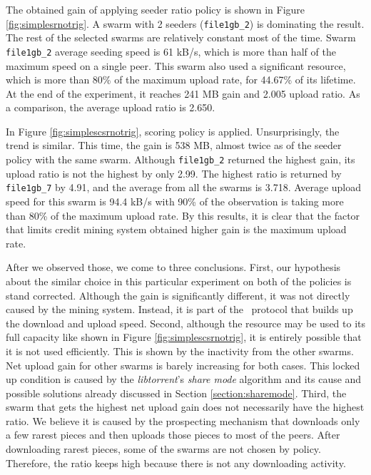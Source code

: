 The obtained gain of applying seeder ratio policy is shown in Figure \ref{fig:simplesrnotrig}. A swarm with 2 seeders (\texttt{file1gb\_2}) is dominating the result. The rest of the selected swarms are relatively constant most of the time. Swarm \texttt{file1gb\_2} average seeding speed is 61 kB/s, which is more than half of the maximum speed on a single peer. This swarm also used a significant resource, which is more than 80\% of the maximum upload rate, for 44.67\% of its lifetime. At the end of the experiment, it reaches 241 MB gain and 2.005 upload ratio. As a comparison, the average upload ratio is 2.650.

In Figure \ref{fig:simplescsrnotrig}, scoring policy is applied. Unsurprisingly, the trend is similar. This time, the gain is 538 MB, almost twice as of the seeder policy with the same swarm.  Although \texttt{file1gb\_2} returned the highest gain, its upload ratio is not the highest by only 2.99.  The highest ratio is returned by \texttt{file1gb\_7} by 4.91, and the average from all the swarms is 3.718. Average upload speed for this swarm is 94.4 kB/s with 90\% of the observation is taking more than 80\% of the maximum upload rate. By this results, it is clear that the factor that limits credit mining system obtained higher gain is the maximum upload rate. 

After we observed those, we come to three conclusions. First, our hypothesis about the similar choice in this particular experiment on both of the policies is stand corrected. Although the gain is significantly different, it was not directly caused by the mining system. Instead, it is part of the \bt~protocol that builds up the download and upload speed. Second, although the resource may be used to its full capacity like shown in Figure \ref{fig:simplescsrnotrig}, it is entirely possible that it is not used efficiently. This is shown by the inactivity from the other swarms. Net upload gain for other swarms is barely increasing for both cases. This locked up condition is caused by the \textit{libtorrent}'s \textit{share mode} algorithm and its cause and possible solutions already discussed in Section \ref{section:sharemode}. Third, the swarm that gets the highest net upload gain does not necessarily have the highest ratio. We believe it is caused by the prospecting mechanism that downloads only a few rarest pieces and then uploads those pieces to most of the peers. After downloading rarest pieces, some of the swarms are not chosen by policy. Therefore, the ratio keeps high because there is not any downloading activity.

